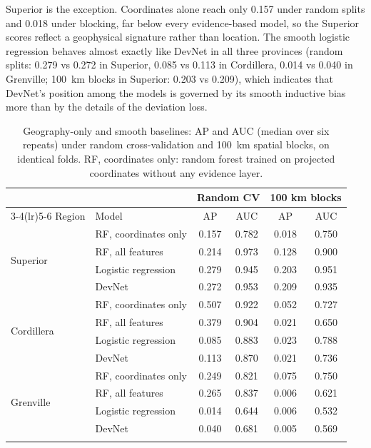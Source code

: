 \documentclass[pdflatex,sn-apa]{sn-jnl}
\begin{document}
Superior is the exception. Coordinates alone reach only 0.157 under random splits and 0.018 under blocking, far below every evidence-based model, so the Superior scores reflect a geophysical signature rather than location. The smooth logistic regression behaves almost exactly like DevNet in all three provinces (random splits: 0.279 vs 0.272 in Superior, 0.085 vs 0.113 in Cordillera, 0.014 vs 0.040 in Grenville; 100~km blocks in Superior: 0.203 vs 0.209), which indicates that DevNet's position among the models is governed by its smooth inductive bias more than by the details of the deviation loss.

\begin{table}[t]
\caption{Geography-only and smooth baselines: AP and AUC (median over six repeats) under random cross-validation and 100~km spatial blocks, on identical folds. RF, coordinates only: random forest trained on projected coordinates without any evidence layer.}\label{tab:geography}
\footnotesize
\setlength{\tabcolsep}{3pt}
\begin{tabular*}{\textwidth}{@{\extracolsep\fill}llcccc}
\toprule
 & & \multicolumn{2}{c}{Random CV} & \multicolumn{2}{c}{100 km blocks} \\
\cmidrule(lr){3-4}\cmidrule(lr){5-6}
Region & Model & AP & AUC & AP & AUC \\
\midrule
\multirow{4}{*}{Superior} & RF, coordinates only & 0.157 & 0.782 & 0.018 & 0.750 \\
 & RF, all features & 0.214 & 0.973 & 0.128 & 0.900 \\
 & Logistic regression & 0.279 & 0.945 & 0.203 & 0.951 \\
 & DevNet & 0.272 & 0.953 & 0.209 & 0.935 \\
\midrule
\multirow{4}{*}{Cordillera} & RF, coordinates only & 0.507 & 0.922 & 0.052 & 0.727 \\
 & RF, all features & 0.379 & 0.904 & 0.021 & 0.650 \\
 & Logistic regression & 0.085 & 0.883 & 0.023 & 0.788 \\
 & DevNet & 0.113 & 0.870 & 0.021 & 0.736 \\
\midrule
\multirow{4}{*}{Grenville} & RF, coordinates only & 0.249 & 0.821 & 0.075 & 0.750 \\
 & RF, all features & 0.265 & 0.837 & 0.006 & 0.621 \\
 & Logistic regression & 0.014 & 0.644 & 0.006 & 0.532 \\
 & DevNet & 0.040 & 0.681 & 0.005 & 0.569 \\
\botrule
\end{tabular*}
\end{table}
\end{document}

